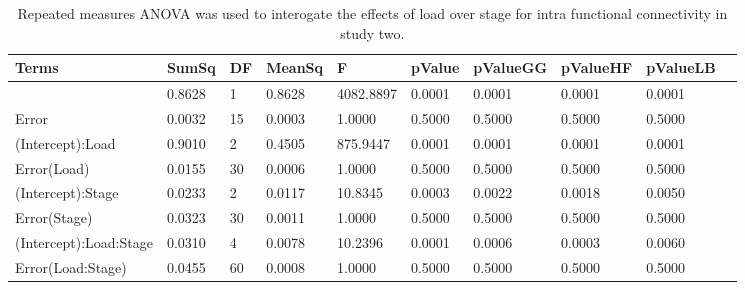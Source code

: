 \begin{table}
\centering
\begin{tabular}[0.2em]{@{}llllllllll@{}}\toprule
Terms & SumSq & DF & MeanSq & F & pValue & pValueGG & pValueHF & pValueLB\\\toprule[0.2em]
(Intercept) & 0.8628 & 1 & 0.8628 & 4082.8897 & 0.0001 & 0.0001 & 0.0001 & 0.0001 \\\midrule
Error & 0.0032 & 15 & 0.0003 & 1.0000 & 0.5000 & 0.5000 & 0.5000 & 0.5000 \\\midrule
(Intercept):Load & 0.9010 & 2 & 0.4505 & 875.9447 & 0.0001 & 0.0001 & 0.0001 & 0.0001 \\\midrule
Error(Load) & 0.0155 & 30 & 0.0006 & 1.0000 & 0.5000 & 0.5000 & 0.5000 & 0.5000 \\\midrule
(Intercept):Stage & 0.0233 & 2 & 0.0117 & 10.8345 & 0.0003 & 0.0022 & 0.0018 & 0.0050 \\\midrule
Error(Stage) & 0.0323 & 30 & 0.0011 & 1.0000 & 0.5000 & 0.5000 & 0.5000 & 0.5000 \\\midrule
(Intercept):Load:Stage & 0.0310 & 4 & 0.0078 & 10.2396 & 0.0001 & 0.0006 & 0.0003 & 0.0060 \\\midrule
Error(Load:Stage) & 0.0455 & 60 & 0.0008 & 1.0000 & 0.5000 & 0.5000 & 0.5000 & 0.5000 \\\bottomrule[0.2em]
\end{tabular}
\caption{Repeated measures ANOVA was used to interogate the effects of load over stage for intra functional connectivity in study two.\label{tabel:tbl_RMAAFC2}}
\end{table}
